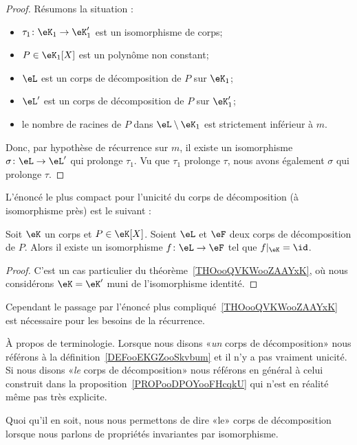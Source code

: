 \begin{proof}
    Résumons la situation :
    \begin{itemize}
        \item \( \tau_1\colon \eK_1\to \eK'_1\) est un isomorphisme de corps;
        \item \( P\in \eK_1[X]\) est un polynôme non constant;
        \item \( \eL\) est un corps de décomposition de \( P\) sur \( \eK_1\);
        \item \( \eL'\) est un corps de décomposition de \( P\) sur \( \eK'_1\);
        \item le nombre de racines de \( P\) dans \( \eL\setminus \eK_1\) est strictement inférieur à \( m\).
    \end{itemize}
    Donc, par hypothèse de récurrence sur \( m\), il existe un isomorphisme \( \sigma\colon \eL\to \eL'\) qui prolonge \( \tau_1\). Vu que \( \tau_1\) prolonge \( \tau\), nous avons également \( \sigma\) qui prolonge \( \tau\).
\end{proof}

L'énoncé le plus compact pour l'unicité du corps de décomposition (à isomorphisme près) est le suivant :
\begin{proposition}     \label{PropTMkfyM}
    Soit \( \eK\) un corps et \( P\in\eK[X]\). Soient \( \eL\) et \( \eF\) deux corps de décomposition de \( P\). Alors il existe un isomorphisme \( f\colon \eL\to \eF\) tel que \( f|_{\eK}=\id\).
\end{proposition}
\begin{proof}
    C'est un cas particulier du théorème~\ref{THOooQVKWooZAAYxK}, où nous considérons \( \eK=\eK'\) muni de l'isomorphisme identité.
\end{proof}

Cependant le passage par l'énoncé plus compliqué~\ref{THOooQVKWooZAAYxK} est nécessaire pour les besoins de la récurrence.

\begin{normaltext}
    À propos de terminologie. Lorsque nous disons «\emph{un} corps de décomposition» nous référons à la définition~\ref{DEFooEKGZooSkvbum} et il n'y a pas vraiment unicité. Si nous disons «\emph{le} corps de décomposition» nous référons en général à celui construit dans la proposition~\ref{PROPooDPOYooFHcqkU} qui n'est en réalité même pas très explicite.

    Quoi qu'il en soit, nous nous permettons de dire «le» corps de décomposition lorsque nous parlons de propriétés invariantes par isomorphisme.
\end{normaltext}

